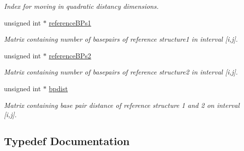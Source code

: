 \begin{DoxyCompactItemize}
\begin{DoxyCompactList}\small\item\em Index for moving in quadratic distancy dimensions. \end{DoxyCompactList}\item 
unsigned int $\ast$ \hyperlink{group__kl__neighborhood__mfe_a536525b98c1b633d4c5f2da4f8d78c18}{reference\+B\+Ps1}\hypertarget{group__kl__neighborhood__mfe_a536525b98c1b633d4c5f2da4f8d78c18}{}\label{group__kl__neighborhood__mfe_a536525b98c1b633d4c5f2da4f8d78c18}

\begin{DoxyCompactList}\small\item\em Matrix containing number of basepairs of reference structure1 in interval \mbox{[}i,j\mbox{]}. \end{DoxyCompactList}\item 
unsigned int $\ast$ \hyperlink{group__kl__neighborhood__mfe_aa7abf73c3114cb5f0dc90e702fa9dd0f}{reference\+B\+Ps2}\hypertarget{group__kl__neighborhood__mfe_aa7abf73c3114cb5f0dc90e702fa9dd0f}{}\label{group__kl__neighborhood__mfe_aa7abf73c3114cb5f0dc90e702fa9dd0f}

\begin{DoxyCompactList}\small\item\em Matrix containing number of basepairs of reference structure2 in interval \mbox{[}i,j\mbox{]}. \end{DoxyCompactList}\item 
unsigned int $\ast$ \hyperlink{group__kl__neighborhood__mfe_af1106e1a592e2dccc92b3452340549e0}{bpdist}\hypertarget{group__kl__neighborhood__mfe_af1106e1a592e2dccc92b3452340549e0}{}\label{group__kl__neighborhood__mfe_af1106e1a592e2dccc92b3452340549e0}

\begin{DoxyCompactList}\small\item\em Matrix containing base pair distance of reference structure 1 and 2 on interval \mbox{[}i,j\mbox{]}. \end{DoxyCompactList}\end{DoxyCompactItemize}


\subsection{Typedef Documentation}
